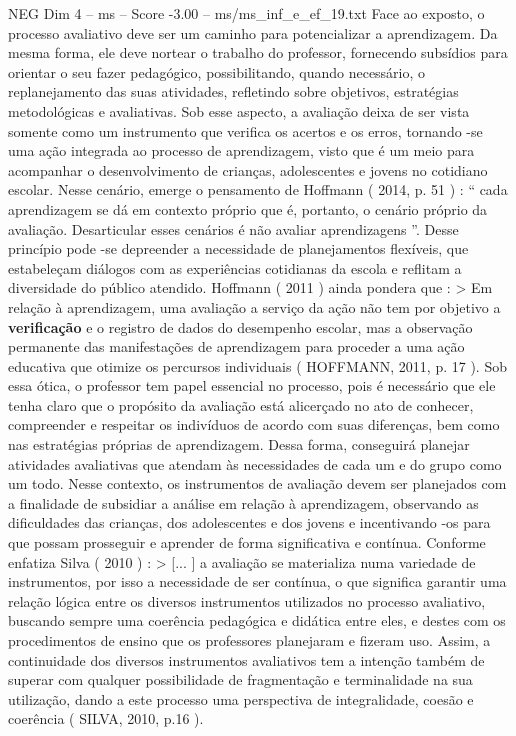 \begin{textsample}{NEG Dim 4 – ms – Score -3.00 – ms/ms\_inf\_e\_ef\_19.txt}
Face ao exposto, o processo avaliativo deve ser um caminho para potencializar a aprendizagem.
Da mesma forma, ele deve nortear o trabalho do professor, fornecendo subsídios para orientar o seu fazer pedagógico, possibilitando, quando necessário, o replanejamento das suas atividades, refletindo sobre objetivos, estratégias metodológicas e avaliativas.
Sob esse aspecto, a avaliação deixa de ser vista somente como um instrumento que verifica os acertos e os erros, tornando -se uma ação integrada ao processo de aprendizagem, visto que é um meio para acompanhar o desenvolvimento de crianças, adolescentes e jovens no cotidiano escolar.
Nesse cenário, emerge o pensamento de Hoffmann ( 2014, p. 51 ) : “ cada aprendizagem se dá em contexto próprio que é, portanto, o cenário próprio da avaliação.
Desarticular esses cenários é não avaliar aprendizagens ”.
Desse princípio pode -se depreender a necessidade de planejamentos flexíveis, que estabeleçam diálogos com as experiências cotidianas da escola e reflitam a diversidade do público atendido.
Hoffmann ( 2011 ) ainda pondera que : > Em relação à aprendizagem, uma avaliação a serviço da ação não tem por objetivo a \textbf{verificação} e o registro de dados do desempenho escolar, mas a observação permanente das manifestações de aprendizagem para proceder a uma ação educativa que otimize os percursos individuais ( HOFFMANN, 2011, p. 17 ).
Sob essa ótica, o professor tem papel essencial no processo, pois é necessário que ele tenha claro que o propósito da avaliação está alicerçado no ato de conhecer, compreender e respeitar os indivíduos de acordo com suas diferenças, bem como nas estratégias próprias de aprendizagem.
Dessa forma, conseguirá planejar atividades avaliativas que atendam às necessidades de cada um e do grupo como um todo.
Nesse contexto, os instrumentos de avaliação devem ser planejados com a finalidade de subsidiar a análise em relação à aprendizagem, observando as dificuldades das crianças, dos adolescentes e dos jovens e incentivando -os para que possam prosseguir e aprender de forma significativa e contínua.
Conforme enfatiza Silva ( 2010 ) : > [... ] a avaliação se materializa numa variedade de instrumentos, por isso a necessidade de ser contínua, o que significa garantir uma relação lógica entre os diversos instrumentos utilizados no processo avaliativo, buscando sempre uma coerência pedagógica e didática entre eles, e destes com os procedimentos de ensino que os professores planejaram e fizeram uso.
Assim, a continuidade dos diversos instrumentos avaliativos tem a intenção também de superar com qualquer possibilidade de fragmentação e terminalidade na sua utilização, dando a este processo uma perspectiva de integralidade, coesão e coerência ( SILVA, 2010, p.16 ).

\end{textsample}
